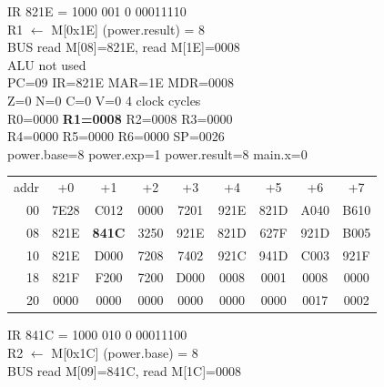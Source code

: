 \noindent\begin{tcolorbox}[stepbox, title={Step 24 \hfill PC 08 \quad LD R1, power.result}]
\textcolor{dim}{IR} 821E = 1000 001 0 00011110\\
R1 $\leftarrow$ M[0x1E] (power.result) = 8\\
\textcolor{dim}{BUS} read M[08]=821E, read M[1E]=0008\\
\textcolor{dim}{ALU} \textcolor{dim}{not used}\\
PC=09 IR=821E MAR=1E MDR=0008\\
Z=0 N=0 C=0 V=0 \hfill \textcolor{dim}{4 clock cycles}\\
R0=0000 \textcolor{wrt}{\textbf{R1=0008}} R2=0008 R3=0000\\
R4=0000 R5=0000 R6=0000 SP=0026\\
\textcolor{dim}{power.base=8  power.exp=1  power.result=8  main.x=0}\\[1pt]
{\setlength{\tabcolsep}{1.6pt}\begin{tabular}{@{}r*{8}{c}@{}}
\textcolor{dim}{addr} & \textcolor{dim}{+0} & \textcolor{dim}{+1} & \textcolor{dim}{+2} & \textcolor{dim}{+3} & \textcolor{dim}{+4} & \textcolor{dim}{+5} & \textcolor{dim}{+6} & \textcolor{dim}{+7}\\
\textcolor{dim}{00} & 7E28 & C012 & 0000 & 7201 & 921E & 821D & A040 & B610\\
\textcolor{dim}{08} & 821E & \cellcolor{pcc}\textbf{841C} & 3250 & 921E & 821D & 627F & 921D & B005\\
\textcolor{dim}{10} & 821E & D000 & 7208 & 7402 & 921C & 941D & C003 & 921F\\
\textcolor{dim}{18} & 821F & F200 & 7200 & D000 & \cellcolor{datac}0008 & \cellcolor{datac}0001 & \cellcolor{datac}0008 & \cellcolor{datac}0000\\
\textcolor{dim}{20} & \cellcolor{stackc}0000 & \cellcolor{stackc}0000 & \cellcolor{stackc}0000 & \cellcolor{stackc}0000 & \cellcolor{stackc}0000 & \cellcolor{stackc}0000 & \cellcolor{stackc}0017 & \cellcolor{stackc}0002\\
\end{tabular}}
\end{tcolorbox}\hfill\begin{tcolorbox}[stepbox, title={Step 25 \hfill PC 09 \quad LD R2, power.base}]
\textcolor{dim}{IR} 841C = 1000 010 0 00011100\\
R2 $\leftarrow$ M[0x1C] (power.base) = 8\\
\textcolor{dim}{BUS} read M[09]=841C, read M[1C]=0008\\

\end{tcolorbox}

